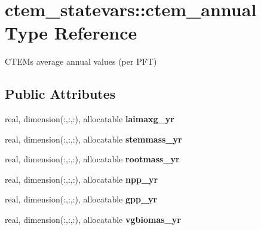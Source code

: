 \hypertarget{structctem__statevars_1_1ctem__annual}{}\section{ctem\+\_\+statevars\+:\+:ctem\+\_\+annual Type Reference}
\label{structctem__statevars_1_1ctem__annual}


C\+T\+E\+M\textquotesingle{}s average annual values (per P\+F\+T)  


\subsection*{Public Attributes}
\begin{DoxyCompactItemize}
\item 
\hypertarget{structctem__statevars_1_1ctem__annual_a23c7b327da608806c8aaa9a8cb0344d9}{}real, dimension(\+:,\+:,\+:), allocatable {\bfseries laimaxg\+\_\+yr}\label{structctem__statevars_1_1ctem__annual_a23c7b327da608806c8aaa9a8cb0344d9}

\item 
\hypertarget{structctem__statevars_1_1ctem__annual_aeec407e50b37fc0fb1e18363ca7a1ccf}{}real, dimension(\+:,\+:,\+:), allocatable {\bfseries stemmass\+\_\+yr}\label{structctem__statevars_1_1ctem__annual_aeec407e50b37fc0fb1e18363ca7a1ccf}

\item 
\hypertarget{structctem__statevars_1_1ctem__annual_ad9769b52500669e2165ddbe3f754ef6c}{}real, dimension(\+:,\+:,\+:), allocatable {\bfseries rootmass\+\_\+yr}\label{structctem__statevars_1_1ctem__annual_ad9769b52500669e2165ddbe3f754ef6c}

\item 
\hypertarget{structctem__statevars_1_1ctem__annual_aefcb16312997e1a0852be1243bc25d13}{}real, dimension(\+:,\+:,\+:), allocatable {\bfseries npp\+\_\+yr}\label{structctem__statevars_1_1ctem__annual_aefcb16312997e1a0852be1243bc25d13}

\item 
\hypertarget{structctem__statevars_1_1ctem__annual_a2a58d07d56bf7eb88980aa6120524ebe}{}real, dimension(\+:,\+:,\+:), allocatable {\bfseries gpp\+\_\+yr}\label{structctem__statevars_1_1ctem__annual_a2a58d07d56bf7eb88980aa6120524ebe}

\item 
\hypertarget{structctem__statevars_1_1ctem__annual_ad78acf083f53265d9a48666313eb73ba}{}real, dimension(\+:,\+:,\+:), allocatable {\bfseries vgbiomas\+\_\+yr}\label{structctem__statevars_1_1ctem__annual_ad78acf083f53265d9a48666313eb73ba}


\end{DoxyCompactItemize}
